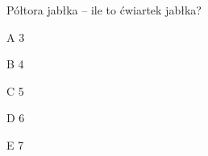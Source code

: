 \begin{tresc}
Półtora jabłka – ile to ćwiartek jabłka?
\end{tresc}
\begin{wariant}{A} 3 \end{wariant}
\begin{wariant}{B} 4 \end{wariant}
\begin{wariant}{C} 5 \end{wariant}
\begin{wariant}{D} 6 \end{wariant}
\begin{wariant}{E} 7 \end{wariant}
